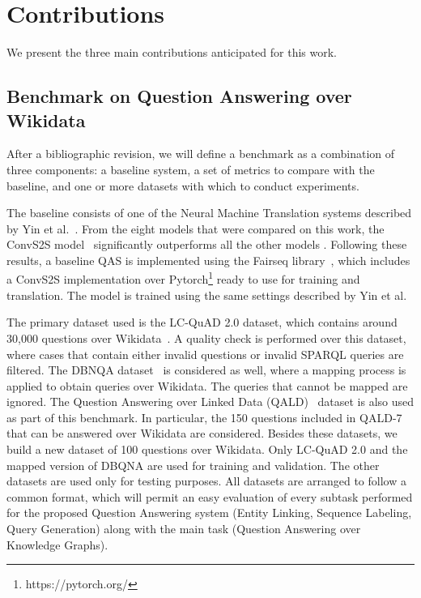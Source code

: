 \section{Contributions}
We present the three main contributions anticipated for this work.
\subsection*{Benchmark on Question Answering over Wikidata}
After a bibliographic revision, we will define a benchmark as a combination of three 
components: a baseline system, a set of metrics to compare with the baseline, and one or 
more datasets with which to conduct experiments.

The baseline consists of one of the Neural Machine Translation systems described by 
Yin et al.~\cite{nmt:nl-to-sparql-Yin19}. From the eight models that were compared on this work, 
the ConvS2S model~\cite{nmt:convS2S-GehringAGYD17} 
significantly outperforms all the other models . Following these results, a baseline QAS is 
implemented using the Fairseq library~\cite{nmt:fairseq-OttEBFGNGA19}, which includes a ConvS2S implementation over 
Pytorch\footnote{https://pytorch.org/} ready to use for training and translation. The model is trained using the same 
settings described by Yin et al.

The primary dataset used is the LC-QuAD 2.0 dataset, which contains around 30,000 
questions over Wikidata~\cite{dataset:lcquad2-DubeyBA019}. A quality check is performed over this dataset, where cases 
that contain either invalid questions or invalid SPARQL queries are filtered. The DBNQA 
dataset~\cite{dataset:dbnqa-hartmann-marx-soru-2018} is considered as well, where a mapping process is applied to obtain queries over 
Wikidata. The queries that cannot be mapped are ignored. The Question Answering over 
Linked Data (QALD)~\cite{qa:qald-Lopezetal2013} dataset is also used as part of this benchmark. In particular, the 
150 questions included in QALD-7~\cite{dataset:qald7-UsbeckNHKRN17} that can be answered over Wikidata are considered. 
Besides these datasets, we build a new dataset of 100 questions over Wikidata. Only LC-QuAD 2.0 
and the mapped version of DBQNA are used for training and validation. The other 
datasets are used only for testing purposes. All datasets are arranged to follow a common 
format, which will permit an easy evaluation of every subtask performed for the proposed 
Question Answering system (Entity Linking, Sequence Labeling, Query Generation) along 
with the main task (Question Answering over Knowledge Graphs).

